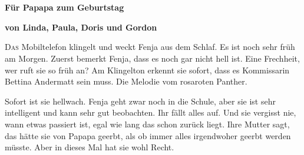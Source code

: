 \pagestyle{empty}
\section*{}
\centerline{\Huge \color{blue}\SixFlowerPetalDotted}
\vspace{13pt}
\centerline{\bf \large\color{blue}Für Papapa zum Geburtstag }
\vspace{13pt}
\centerline{\bf \color{blue} von Linda, Paula, Doris und Gordon}
\vspace{13pt}
\centerline{\huge \color{blue}\SixFlowerPetalDotted}
\vspace{13pt}
\centerline{\LARGE \color{blue}\SixFlowerPetalDotted}
\vspace{13pt}
\centerline{\Large \color{blue}\SixFlowerPetalDotted}
\vspace{13pt}
\centerline{\large \color{blue}\SixFlowerPetalDotted}
\vspace{13pt}
\centerline{\normalsize \color{blue}\SixFlowerPetalDotted}
\vspace{13pt}
\centerline{\small \color{blue}\SixFlowerPetalDotted}
\vspace{13pt}
\centerline{\footnotesize \color{blue}\SixFlowerPetalDotted}
\vspace{13pt}
\centerline{\scriptsize \color{blue}\SixFlowerPetalDotted}
\vspace{13pt}
\centerline{\tiny \color{blue}\SixFlowerPetalDotted}

\newpage
\pagestyle{scrheadings}

\lettrine[lines=3]{\color{blue}D}{as} Mobiltelefon klingelt und weckt Fenja aus dem Schlaf. Es ist noch sehr früh am Morgen. Zuerst bemerkt Fenja, dass es noch gar nicht hell ist. Eine Frechheit, wer ruft sie so früh an? Am Klingelton erkennt sie sofort, dass es Kommissarin Bettina Andermatt sein muss. Die Melodie vom rosaroten Panther.

Sofort ist sie hellwach. Fenja geht zwar noch in die Schule, aber sie ist sehr intelligent und kann sehr gut beobachten. Ihr fällt alles auf. Und sie vergisst nie, wann etwas passiert ist, egal wie lang das schon zurück liegt. Ihre Mutter sagt, das hätte sie von Papapa geerbt, als ob immer alles irgendwoher geerbt werden müsste. Aber in dieses Mal hat sie wohl Recht. 

